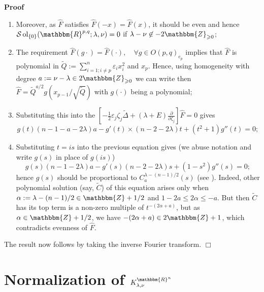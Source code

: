 \documentclass{article}
\newcommand{\assign}{:=}
\newcommand{\nin}{\not\in}
\newcommand{\tmop}[1]{\ensuremath{\operatorname{#1}}}
\newenvironment{proof}{\noindent\textbf{Proof\ }}{\hspace*{\fill}$\Box$\medskip}
\numberwithin{definition}{section}
\numberwithin{lemma}{section}
\numberwithin{proposition}{section}
{\theorembodyfont{\rmfamily}\newtheorem{remark}{Remark}
\numberwithin{remark}{section}
}
\begin{document}
\begin{proof}
\begin{enumerate}
    \item Moreover, as $\hat{F}$ satisfies $\hat{F} ( - x) = \hat{F} ( x)$, it
    should be even and hence $\mathcal{S} \tmop{ol}_{\{ 0 \}} (
    \mathbbm{R}^{p, q} ; \lambda, \nu) = 0$ if $\lambda - \nu \nin -
    2\mathbbm{Z}_{\geqslant 0}$;
    
    \item The requirement $\hat{F} ( g \cdot) = \hat{F} ( \cdot), \hspace{1em}
    \forall g \in O ( p, q)_{e_p}$ implies that $\hat{F}$ is polynomial in
    $\tilde{Q} \assign \sum_{i = 1 ; i \neq p}^n \varepsilon_i x_i^2$ and
    $x_p$. Hence, using homogeneity with degree $a \assign \nu - \lambda \in
    2\mathbbm{Z}_{\geqslant 0}$ we can write then $\hat{F} = \tilde{Q}^{a / 2}
    g \left( x_{p - 1} / \sqrt{\tilde{Q}} \right)$ with $g ( \cdot)$ being a
    polynomial;
    
    \item Substituting this into the $\left[ - \frac{1}{2} \varepsilon_j
    \zeta_j \tilde{\Delta} + ( \lambda + E) \frac{\partial}{\partial \zeta_j}
    \right] \hat{F} = 0$ gives
    \[ g ( t) ( n - 1 - a - 2 \lambda) a - g' ( t) \times ( n - 2 - 2
       \lambda) t + ( t^2 + 1) g'' ( t) = 0 ; \]
    \item Substituting $t = i s$ into the previous equation gives (we abuse
    notation and write $g ( s)$ in place of $g ( i s)$)
    \[ g ( s) ( n - 1 - 2 \lambda) a - g' ( s) ( n - 2 - 2 \lambda) s + ( 1 -
       s^2) g'' ( s) = 0 ; \]
    hence $g ( s)$ should be proportional to $C^{\lambda - ( n - 1) / 2}_a (
    s)$ (see {\cite[thm. 11.4]{kobayashi2015differential2}}). Indeed, other
    polynomial solution (say, $\tilde{C}$) of this equation arises only when
    $\alpha \assign \lambda - ( n - 1) / 2 \in \mathbbm{Z}+ 1 / 2$ and $1 - 2
    a \leqslant 2 \alpha \leqslant - a$. But then $\tilde{C}$ has its top term
    is a non-zero multiple of $t^{- ( 2 \alpha + a)}$, but as $\alpha \in
    \mathbbm{Z}+ 1 / 2$, we have $- ( 2 \alpha + a) \in 2\mathbbm{Z}+ 1$,
    which contradicts evenness of $\hat{F}$.
  \end{enumerate}
  The result now follows by taking the inverse Fourier transform.
\end{proof}

\section{Normalization of $K_{\lambda,
\nu}^{\mathbbm{R}^n}$}\label{sec:KR-normalization-even}
\end{document}
